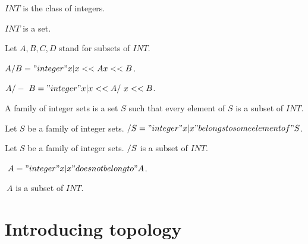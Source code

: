 \documentclass{article}
\begin{document}
  \begin{forthel}
    \begin{definition}
      $INT$ is the class of integers.
    \end{definition}

    \begin{axiom}
      $INT$ is a set.
    \end{axiom}

    Let $A,B,C,D$ stand for subsets of $INT$.

    \begin{definition}[Union]
      $A \-/ B = { "integer" x | x << A \/ x << B }$.
    \end{definition}

    \begin{definition}[Intersection]
      $A /-\ B = { "integer" x | x << A /\ x << B }$.
    \end{definition}

    \begin{definition}[IntegerSets]
      A family of integer sets is a set $S$ such that every element of $S$ is a subset of $INT$.
    \end{definition}

    \begin{definition}[UnionSet]
      Let $S$ be a family of integer sets. $\-/ S = { "integer" x | x "belongs to some element of" S }$.
    \end{definition}

    \begin{lemma}
      Let $S$ be a family of integer sets. $\-/S$ is a subset of $INT$.
    \end{lemma}

    \begin{definition}[Complement]
      $~ A = { "integer" x | x "does not belong to" A }$.
    \end{definition}

    \begin{lemma}
      $~ A$ is a subset of $INT$.
    \end{lemma}
   \end{forthel}


  \section{Introducing topology}
\end{document}
